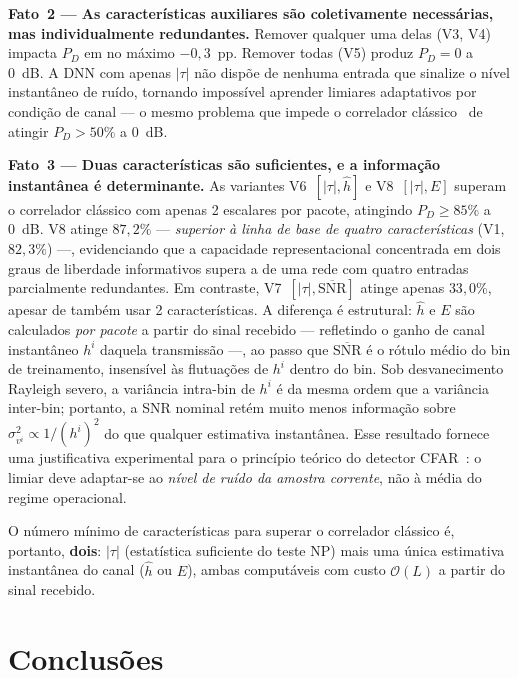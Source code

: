 \documentclass{sbrt}
\begin{document}
\textbf{Fato~2 — As características auxiliares são coletivamente necessárias, mas individualmente redundantes.} Remover qualquer uma delas (V3, V4) impacta $P_D$ em no máximo $-0{,}3$~pp. Remover todas (V5) produz $P_D = 0$ a 0~dB. A DNN com apenas $|\tau|$ não dispõe de nenhuma entrada que sinalize o nível instantâneo de ruído, tornando impossível aprender limiares adaptativos por condição de canal — o mesmo problema que impede o correlador clássico~\cite{ref_xie} de atingir $P_D > 50\%$ a 0~dB.

\textbf{Fato~3 — Duas características são suficientes, e a informação instantânea é determinante.} As variantes V6~$[|\tau|, \hat{h}]$ e V8~$[|\tau|, E]$ superam o correlador clássico com apenas 2 escalares por pacote, atingindo $P_D \geq 85\%$ a 0~dB. V8 atinge $87{,}2\%$ — \emph{superior à linha de base de quatro características} (V1, $82{,}3\%$) —, evidenciando que a capacidade representacional concentrada em dois graus de liberdade informativos supera a de uma rede com quatro entradas parcialmente redundantes. Em contraste, V7~$[|\tau|, \overline{\text{SNR}}]$ atinge apenas $33{,}0\%$, apesar de também usar 2 características. A diferença é estrutural: $\hat{h}$ e $E$ são calculados \emph{por pacote} a partir do sinal recebido — refletindo o ganho de canal instantâneo $h^i$ daquela transmissão —, ao passo que $\overline{\text{SNR}}$ é o rótulo médio do bin de treinamento, insensível às flutuações de $h^i$ dentro do bin. Sob desvanecimento Rayleigh severo, a variância intra-bin de $h^i$ é da mesma ordem que a variância inter-bin; portanto, a SNR nominal retém muito menos informação sobre $\sigma_{v^i}^2 \propto 1/(h^i)^2$ do que qualquer estimativa instantânea. Esse resultado fornece uma justificativa experimental para o princípio teórico do detector CFAR~\cite{ref_poor}: o limiar deve adaptar-se ao \emph{nível de ruído da amostra corrente}, não à média do regime operacional.

O número mínimo de características para superar o correlador clássico é, portanto, \textbf{dois}: $|\tau|$ (estatística suficiente do teste NP) mais uma única estimativa instantânea do canal ($\hat{h}$ ou $E$), ambas computáveis com custo $\mathcal{O}(L)$ a partir do sinal recebido.


\section{Conclusões}
\end{document}
